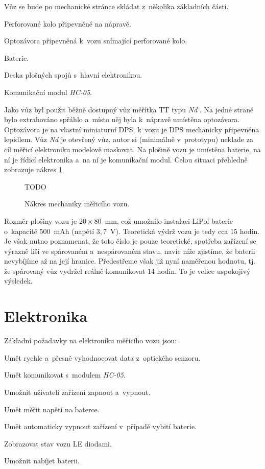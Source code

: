 Vůz se bude po mechanické stránce skládat z~několika základních částí.

\begin{compactenum}
\item Perforované kolo připevněné na nápravě.
\item Optozávora připevněná k~vozu snímající perforované kolo.
\item Baterie.
\item Deska plošných spojů s~hlavní elektronikou.
\item Komunikační modul \textit{HC-05}.
\end{compactenum}

Jako vůz byl použit běžně dostupný vůz měřítka TT typu \textit{Nd}
\cite{vuz-nd}. Na jedné straně bylo extrahováno spřáhlo a~místo něj byla
k~nápravě umístěna optozávora. Optozávora je na vlastní miniaturní DPS, k~vozu
je DPS mechanicky připevněna lepidlem. Vůz \textit{Nd} je otevřený vůz, autor si
(minimálně v~prototypu) neklade za cíl měřicí elektroniku modelově maskovat. Na
plošině vozu je umístěna baterie, na ní je řídicí elektronika a~na ní je
komunikační modul. Celou situaci přehledně zobrazuje nákres
\ref{fig:vuz-nakres}

\begin{figure}[h]
TODO
\caption{Nákres mechaniky měřicího vozu.}
\label{fig:vuz-nakres}
\end{figure}

Rozměr plošiny vozu je $20\times80$~mm, což umožnilo instalaci LiPol baterie
o~kapacitě $500$~mAh (napětí $3,7$~V). Teoretická výdrž vozu je tedy cca $15$
hodin. Je však nutno poznamenat, že toto číslo je pouze teoretické, spotřeba
zařízení se výrazně liší ve spárovaném a~nespárovaném stavu, navíc níže
zjistíme, že baterii nevybíjíme až na její hranice. Předestřeme však již nyní
naměřenou hodnotu, tj. že spárovaný vůz vydržel reálně komunikovat $14$ hodin.
To je velice uspokojivý výsledek.

\section{Elektronika}
\label{sec:wsm-ele}

Základní požadavky na elektroniku měřicího vozu jsou:

\begin{compactenum}
\item Umět rychle a~přesně vyhodnocovat data z~optického senzoru.
\item Umět komunikovat s~modulem \textit{HC-05}.
\item Umožnit uživateli zařízení zapnout a~vypnout.
\item Umět měřit napětí na baterce.
\item Umět automaticky vypnout zařízení v~případě vybití baterie.
\item Zobrazovat stav vozu LE diodami.
\item Umožnit nabíjet baterii.
\end{compactenum}

